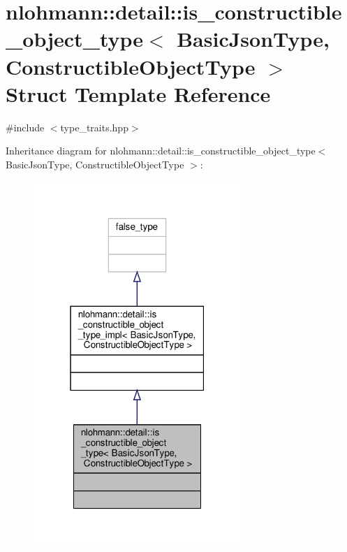 \hypertarget{structnlohmann_1_1detail_1_1is__constructible__object__type}{}\section{nlohmann\+:\+:detail\+:\+:is\+\_\+constructible\+\_\+object\+\_\+type$<$ Basic\+Json\+Type, Constructible\+Object\+Type $>$ Struct Template Reference}
\label{structnlohmann_1_1detail_1_1is__constructible__object__type}


{\ttfamily \#include $<$type\+\_\+traits.\+hpp$>$}



Inheritance diagram for nlohmann\+:\+:detail\+:\+:is\+\_\+constructible\+\_\+object\+\_\+type$<$ Basic\+Json\+Type, Constructible\+Object\+Type $>$\+:
\nopagebreak
\begin{figure}[H]
\begin{center}
\leavevmode
\includegraphics[width=223pt]{structnlohmann_1_1detail_1_1is__constructible__object__type__inherit__graph}
\end{center}
\end{figure}


